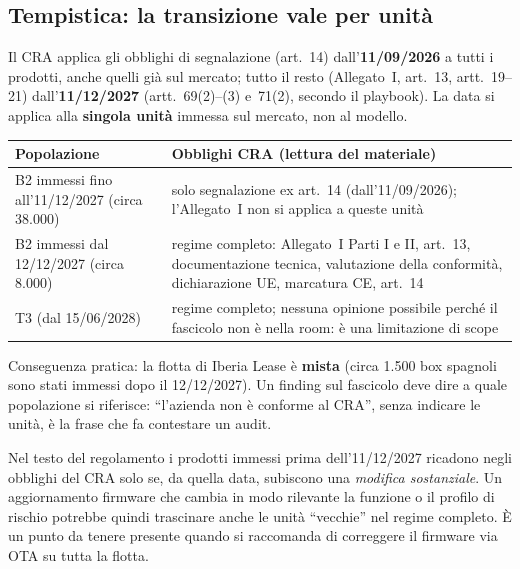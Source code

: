 \subsection{Tempistica: la transizione vale per unità}
Il CRA applica gli obblighi di segnalazione (art.~14) dall'\textbf{11/09/2026} a tutti i prodotti,
anche quelli già sul mercato; tutto il resto (Allegato~I, art.~13, artt.~19--21) dall'\textbf{11/12/2027}
(artt.~69(2)--(3) e~71(2), secondo il playbook). La data si applica alla \textbf{singola unità}
immessa sul mercato, non al modello.

\begin{center}
\small
\begin{tabularx}{\linewidth}{l X}
\toprule
\textbf{Popolazione} & \textbf{Obblighi CRA (lettura del materiale)} \\ \midrule
B2 immessi fino all'11/12/2027 (circa 38.000) & solo segnalazione ex art.~14 (dall'11/09/2026);
  l'Allegato~I non si applica a queste unità \\
B2 immessi dal 12/12/2027 (circa 8.000) & regime completo: Allegato~I Parti I e II, art.~13,
  documentazione tecnica, valutazione della conformità, dichiarazione UE, marcatura CE, art.~14 \\
T3 (dal 15/06/2028) & regime completo; nessuna opinione possibile perché il fascicolo non è nella
  room: è una limitazione di scope \\
\bottomrule
\end{tabularx}
\end{center}
\noindent Conseguenza pratica: la flotta di Iberia Lease è \textbf{mista} (circa 1.500 box spagnoli
sono stati immessi dopo il 12/12/2027). Un finding sul fascicolo deve dire a quale popolazione si
riferisce: ``l'azienda non è conforme al CRA'', senza indicare le unità, è la frase che fa contestare
un audit.

\begin{integrazione}
Nel testo del regolamento i prodotti immessi prima dell'11/12/2027 ricadono negli obblighi del CRA
solo se, da quella data, subiscono una \emph{modifica sostanziale}. Un aggiornamento firmware che
cambia in modo rilevante la funzione o il profilo di rischio potrebbe quindi trascinare anche le
unità ``vecchie'' nel regime completo. È un punto da tenere presente quando si raccomanda di
correggere il firmware via OTA su tutta la flotta.
\end{integrazione}

